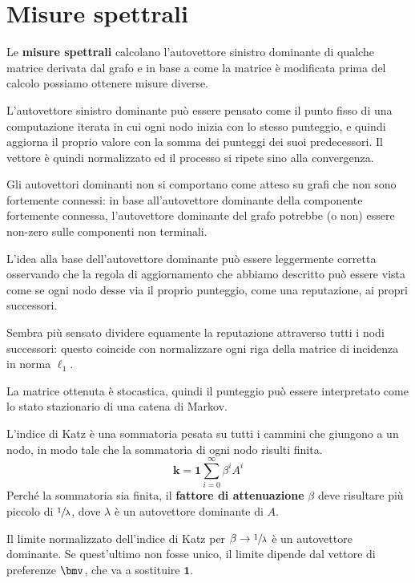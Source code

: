 \documentclass[\main/main.tex]{subfiles}
\begin{document}
\section{Misure spettrali}
\begin{multicols}{2}
\begin{definition}
    Le \textbf{misure spettrali} calcolano l'autovettore sinistro dominante di qualche matrice derivata dal grafo e in base a come la matrice è modificata prima del calcolo possiamo ottenere misure diverse.
\end{definition}
\begin{definition}
    L'autovettore sinistro dominante può essere pensato come il punto fisso di una computazione iterata in cui ogni nodo inizia con lo stesso punteggio, e quindi aggiorna il proprio valore con la somma dei punteggi dei suoi predecessori. Il vettore è quindi normalizzato ed il processo si ripete sino alla convergenza.
    
    Gli autovettori dominanti non si comportano come atteso su grafi che non sono fortemente connessi: in base all'autovettore dominante della componente fortemente connessa, l'autovettore dominante del grafo potrebbe (o non) essere non-zero sulle componenti non terminali.
\end{definition}
\vfill\null
\columnbreak
\begin{definition}
    L'idea alla base dell'autovettore dominante può essere leggermente corretta osservando che la regola di aggiornamento che abbiamo descritto può essere vista come se ogni nodo desse via il proprio punteggio, come una reputazione, ai propri successori.
    
    Sembra più sensato dividere equamente la reputazione attraverso tutti i nodi successori: questo coincide con normalizzare ogni riga della matrice di incidenza in norma \(\ell_1\).
    
    La matrice ottenuta è stocastica, quindi il punteggio può essere interpretato come lo stato stazionario di una catena di Markov.
\end{definition}
\begin{observation}
    L'indice di Katz è una sommatoria pesata su tutti i cammini che giungono a un nodo, in modo tale che la sommatoria di ogni nodo risulti finita.
    \[
        \boldsymbol{k}=\mathbf{1} \sum_{i=0}^{\infty} \beta^{i} A^{i}
    \]
    Perché la sommatoria sia finita, il \textbf{fattore di attenuazione} \(\beta\) deve risultare più piccolo di \(\sfrac{1}{\lambda}\), dove \(\lambda\) è un autovettore dominante di \(A\).
    
    Il limite normalizzato dell'indice di Katz per \(\beta \rightarrow \sfrac{1}{\lambda}\) è un autovettore dominante. Se quest'ultimo non fosse unico, il limite dipende dal vettore di preferenze \(\bmv\), che va a sostituire \(\mathbf{1}\).
\end{observation}
\end{multicols}
\end{document}
